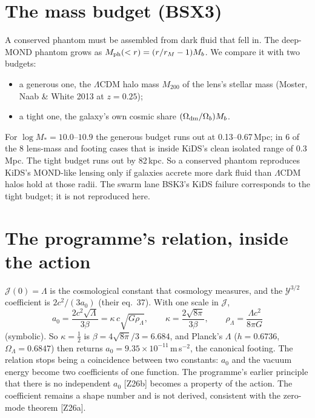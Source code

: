 \documentclass[10pt]{article}
\begin{document}
\section{The mass budget (BSX3)}
A conserved phantom must be assembled from dark fluid that fell in. The deep-MOND phantom grows as $M_{\rm ph}(<r)=(r/r_M-1)M_b$. We compare it with two budgets:
\begin{itemize}
\item a generous one, the $\Lambda$CDM halo mass $M_{200}$ of the lens's stellar mass (Moster, Naab \& White 2013 at $z=0.25$);
\item a tight one, the galaxy's own cosmic share $(\Omega_{\rm dm}/\Omega_b)M_b$.
\end{itemize}
For $\log M_*=10.0$--$10.9$ the generous budget runs out at 0.13--0.67\,Mpc; in 6 of the 8 lens-mass and footing cases that is inside KiDS's clean isolated range of 0.3\,Mpc. The tight budget runs out by 82\,kpc.
So a conserved phantom reproduces KiDS's MOND-like lensing only if galaxies accrete more dark fluid than $\Lambda$CDM halos hold at those radii. The swarm lane BSK3's KiDS failure corresponds to the tight budget; it is not reproduced here.

\section{The programme's relation, inside the action}
$\mathcal J(0)=\Lambda$ is the cosmological constant that cosmology measures, and the $\mathcal Y^{3/2}$ coefficient is $2c^2/(3a_0)$ (their eq.~37). With one scale in $\mathcal J$,
\begin{equation}
a_0=\frac{2c^2\sqrt\Lambda}{3\beta}=\kappa\,c\sqrt{G\rho_\Lambda},\qquad \kappa=\frac{2\sqrt{8\pi}}{3\beta},\qquad \rho_\Lambda=\frac{\Lambda c^2}{8\pi G}
\end{equation}
(symbolic). So $\kappa=\tfrac12$ is $\beta=4\sqrt{8\pi}/3=6.684$, and Planck's $\Lambda$ ($h=0.6736$, $\Omega_\Lambda=0.6847$) then returns $a_0=9.35\times10^{-11}$\,m\,s$^{-2}$, the canonical footing.
The relation stops being a coincidence between two constants: $a_0$ and the vacuum energy become two coefficients of one function. The programme's earlier principle that there is no independent $a_0$ [Z26b] becomes a property of the action.
The coefficient remains a shape number and is not derived, consistent with the zero-mode theorem [Z26a].
\end{document}
